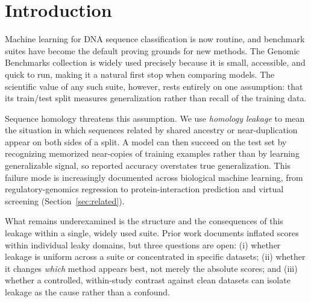 \documentclass[webpdf,modern,large,namedate]{oup-authoring-template}%
\begin{document}

\maketitle

\section{Introduction}

Machine learning for DNA sequence classification is now routine, and benchmark suites have become the default proving grounds for new methods. The Genomic Benchmarks collection \citep{gresova2023} is widely used precisely because it is small, accessible, and quick to run, making it a natural first stop when comparing models. The scientific value of any such suite, however, rests entirely on one assumption: that its train/test split measures generalization rather than recall of the training data.

Sequence homology threatens this assumption. We use \emph{homology leakage} to mean the situation in which sequences related by shared ancestry or near-duplication appear on both sides of a split. A model can then succeed on the test set by recognizing memorized near-copies of training examples rather than by learning generalizable signal, so reported accuracy overstates true generalization. This failure mode is increasingly documented across biological machine learning, from regulatory-genomics regression to protein-interaction prediction and virtual screening (Section~\ref{sec:related}).

What remains underexamined is the structure and the consequences of this leakage within a single, widely used suite. Prior work documents inflated scores within individual leaky domains, but three questions are open: (i) whether leakage is uniform across a suite or concentrated in specific datasets; (ii) whether it changes \emph{which} method appears best, not merely the absolute scores; and (iii) whether a controlled, within-study contrast against clean datasets can isolate leakage as the cause rather than a confound.
\end{document}
